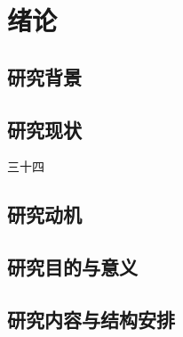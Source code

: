 \section{绪论} %
\subsection{研究背景}

\subsection{研究现状}
三十四\cite{1018047768.nh}
\subsection{研究动机}

\subsection{研究目的与意义}

\subsection{研究内容与结构安排}


